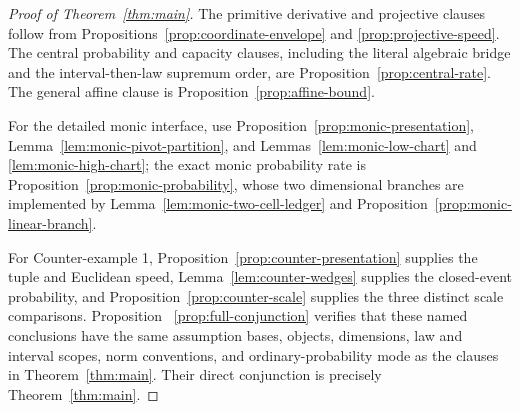\begin{proof}[Proof of Theorem~\ref{thm:main}]
The primitive derivative and projective clauses follow from
Propositions~\ref{prop:coordinate-envelope} and
\ref{prop:projective-speed}.  The central probability and capacity clauses,
including the literal algebraic bridge and the interval-then-law supremum
order, are Proposition~\ref{prop:central-rate}.  The general affine clause is
Proposition~\ref{prop:affine-bound}.

For the detailed monic interface, use
Proposition~\ref{prop:monic-presentation},
Lemma~\ref{lem:monic-pivot-partition}, and
Lemmas~\ref{lem:monic-low-chart} and
\ref{lem:monic-high-chart}; the exact monic probability rate is
Proposition~\ref{prop:monic-probability}, whose two dimensional branches are
implemented by Lemma~\ref{lem:monic-two-cell-ledger} and
Proposition~\ref{prop:monic-linear-branch}.

For Counter-example 1, Proposition~\ref{prop:counter-presentation} supplies
the tuple and Euclidean speed, Lemma~\ref{lem:counter-wedges} supplies the
closed-event probability, and Proposition~\ref{prop:counter-scale} supplies
the three distinct scale comparisons.  Proposition
~\ref{prop:full-conjunction} verifies that these named conclusions have the
same assumption bases, objects, dimensions, law and interval scopes, norm
conventions, and ordinary-probability mode as the clauses in
Theorem~\ref{thm:main}.
Their direct conjunction is precisely Theorem~\ref{thm:main}.
\end{proof}
